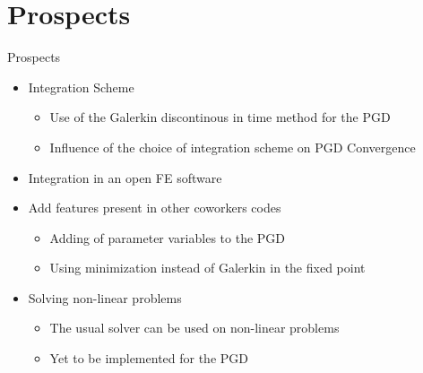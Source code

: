 \documentclass[12pt]{beamer}
\newcommand\FontPersp{\fontsize{10}{12}\selectfont}
\begin{document}
\section{Prospects}

\begin{frame}{Prospects}
\FontPersp
	\begin{itemize}
		\item Integration Scheme
			\begin{itemize}
			\FontPersp
			\item Use of the Galerkin discontinous in time method for the PGD
			\item Influence of the choice of integration scheme on PGD Convergence
			\end{itemize}
		\item Integration in an open FE software
		\item Add features present in other coworkers codes
			\begin{itemize}
			\FontPersp
			\item Adding of parameter variables to the PGD %
			\item Using minimization instead of Galerkin in the fixed point
			\end{itemize}
		\item Solving non-linear problems
			\begin{itemize}
			\FontPersp
			\item The usual solver can be used on non-linear problems
			\item Yet to be implemented for the PGD
			\end{itemize}
	\end{itemize}
\end{frame}
\end{document}
